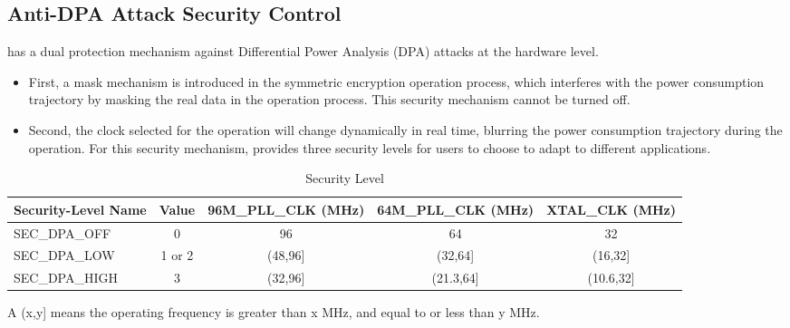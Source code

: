 \documentclass[main\_\_EN.tex]{subfiles}
\begin{document}
\subsection{Anti-DPA Attack Security Control}
\label{sec:sysreg-anti-dpa-attack-security-control}

\chipname{} has a dual protection mechanism against Differential Power Analysis (DPA) attacks at the hardware level. 

\begin{itemize}
    \item First, a mask mechanism is introduced in the symmetric encryption operation process, which interferes with the power consumption trajectory by masking the real data in the operation process. This security mechanism cannot be turned off.
    \item Second, the clock selected for the operation will change dynamically in real time, blurring the power consumption trajectory during the operation. For this security mechanism, \chipname{} provides three security levels for users to choose to adapt to different applications.
\end{itemize}


\begin{table}[H]
    \centering
    \caption{Security Level}
    \label{tab:sysreg-security-level}
    \begin{threeparttable}
    \begin{tabular}[c]{| l | c | c | c | c |}  
    \hline
    \rowcolor{lightgray}
        \textbf{Security-Level Name} & \textbf{Value} & \textbf{96M\_PLL\_CLK (MHz)} & \textbf{64M\_PLL\_CLK (MHz)} & \textbf{XTAL\_CLK (MHz)} \\ \hline
        SEC\_DPA\_OFF       & 0    & 96               & 64                 & 32                 \\\hline
        SEC\_DPA\_LOW       & 1 or 2    & (48,96]\tnote{A} & (32,64]\tnote{A}   & (16,32]\tnote{A}   \\\hline
        SEC\_DPA\_HIGH      & 3    & (32,96]\tnote{A} & (21.3,64]\tnote{A} & (10.6,32]\tnote{A}   \\\hline
    \end{tabular}
    \begin{tablenotes}
        \item[A] (x,y] means the operating frequency is greater than x MHz, and equal to or less than y MHz.
    \end{tablenotes}
    \end{threeparttable}
\end{table}
\end{document}
